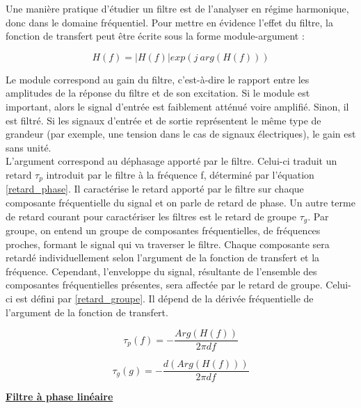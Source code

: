 	Une manière pratique d'étudier un filtre est de l'analyser en régime harmonique, donc dans le domaine fréquentiel. Pour mettre en évidence l'effet du filtre, la fonction de transfert peut être écrite sous la forme module-argument :
	
	\begin{equation}\label{key}
	H(f) = |H(f)|exp(j~arg(H(f)))
	\end{equation}
	
	 Le module correspond au gain du filtre, c'est-à-dire le rapport entre les amplitudes de la réponse du filtre et de son excitation. Si le module est important, alors le signal d'entrée est faiblement atténué voire amplifié. Sinon, il est filtré.
	Si les signaux d'entrée et de sortie représentent le même type de grandeur (par exemple, une tension dans le cas de signaux électriques), le gain est sans unité.\\ 
	
	L'argument correspond au déphasage apporté par le filtre. Celui-ci traduit un retard $ \tau_p $ introduit par le filtre à la fréquence f, déterminé par l'équation \ref{retard_phase}.	Il caractérise le retard apporté par le filtre sur chaque composante fréquentielle du signal et on parle de retard de phase. Un autre terme de retard courant pour caractériser les filtres est le retard de groupe $ \tau_g $. Par groupe, on entend un groupe de composantes fréquentielles, de fréquences proches, formant le signal qui va traverser le filtre. Chaque composante sera retardé individuellement selon l'argument de la fonction de transfert et la fréquence. Cependant, l'enveloppe du signal, résultante de l'ensemble des composantes fréquentielles présentes, sera affectée par le retard de groupe. Celui-ci est défini par \ref{retard_groupe}. Il dépend de la dérivée fréquentielle de l'argument de la fonction de transfert.  
	
	\begin{equation}\label{retard_phase}
	\tau_p(f) = -\frac{Arg(H(f))}{2\pi df}
	\end{equation}
	
	\begin{equation}\label{retard_groupe}
	\tau_g(g) = -\frac{d(Arg(H(f)))}{2\pi df}
	\end{equation}
	
	\vspace{1\baselineskip}
	
	\underline{\textbf{Filtre à phase linéaire}}
	
